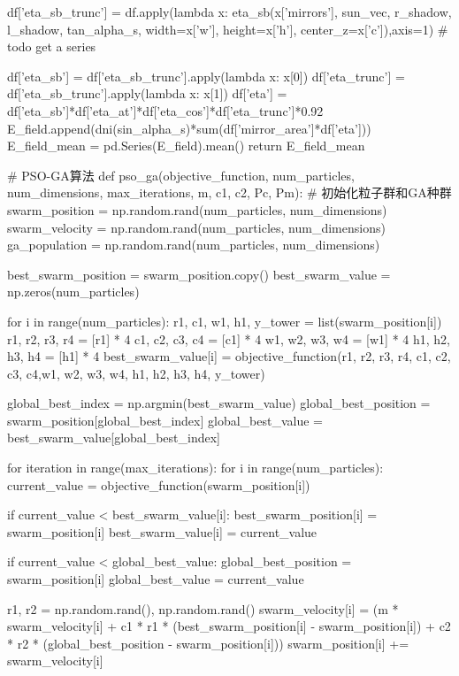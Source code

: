 \documentclass{article}
\numberwithin{equation}{subsection}
\begin{document}
\begin{python}
        df['eta_sb_trunc'] = df.apply(lambda x: eta_sb(x['mirrors'], sun_vec, r_shadow, l_shadow, tan_alpha_s, width=x['w'], height=x['h'], center_z=x['c']),axis=1)            # todo get a series

        df['eta_sb'] = df['eta_sb_trunc'].apply(lambda x: x[0])
        df['eta_trunc'] = df['eta_sb_trunc'].apply(lambda x: x[1])
        df['eta'] = df['eta_sb']*df['eta_at']*df['eta_cos']*df['eta_trunc']*0.92
        E_field.append(dni(sin_alpha_s)*sum(df['mirror_area']*df['eta']))
    E_field_mean = pd.Series(E_field).mean()
    return E_field_mean


# PSO-GA算法
def pso_ga(objective_function, num_particles, num_dimensions, max_iterations,
           m, c1, c2, Pc, Pm):
    # 初始化粒子群和GA种群
    swarm_position = np.random.rand(num_particles, num_dimensions)
    swarm_velocity = np.random.rand(num_particles, num_dimensions)
    ga_population = np.random.rand(num_particles, num_dimensions)


    best_swarm_position = swarm_position.copy()
    best_swarm_value = np.zeros(num_particles)

    for i in range(num_particles):
        r1, c1, w1, h1, y_tower = list(swarm_position[i])
        r1, r2, r3, r4 = [r1] * 4
        c1, c2, c3, c4 = [c1] * 4
        w1, w2, w3, w4 = [w1] * 4
        h1, h2, h3, h4 = [h1] * 4
        best_swarm_value[i] = objective_function(r1, r2, r3, r4,  c1, c2, c3, c4,w1, w2, w3, w4, h1, h2, h3, h4, y_tower)

    global_best_index = np.argmin(best_swarm_value)
    global_best_position = swarm_position[global_best_index]
    global_best_value = best_swarm_value[global_best_index]

    for iteration in range(max_iterations):
        for i in range(num_particles):
            current_value = objective_function(swarm_position[i])

            if current_value < best_swarm_value[i]:
                best_swarm_position[i] = swarm_position[i]
                best_swarm_value[i] = current_value

            if current_value < global_best_value:
                global_best_position = swarm_position[i]
                global_best_value = current_value

            r1, r2 = np.random.rand(), np.random.rand()
            swarm_velocity[i] = (m * swarm_velocity[i] +
                                  c1 * r1 * (best_swarm_position[i] - swarm_position[i]) +
                                  c2 * r2 * (global_best_position - swarm_position[i]))
            swarm_position[i] += swarm_velocity[i]


\end{python}
\end{document}
